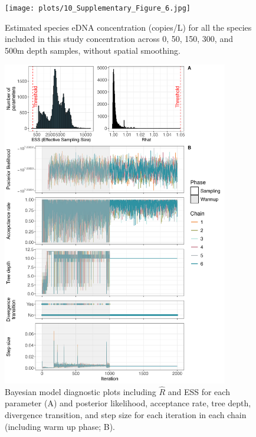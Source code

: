 \documentclass{article}
\begin{document}
\begin{figure}
\centering
\texttt{[image: plots/10\_Supplementary\_Figure\_6.jpg]}
\caption{Estimated species eDNA concentration (copies/L) for all the species included in this study concentration across 0, 50, 150, 300, and 500m depth samples, without spatial smoothing.}
\end{figure}

\begin{figure}
\centering
\includegraphics[width=0.88\textwidth]{plots/11_Diagnostic_Fig_1.jpg}
\caption{Bayesian model diagnostic plots including $\hat{R}$ and ESS for each parameter (A) and posterior likelihood, acceptance rate, tree depth, divergence transition, and step size for each iteration in each chain (including warm up phase; B).}
\label{tab:diagnostics}
\end{figure}
\end{document}
